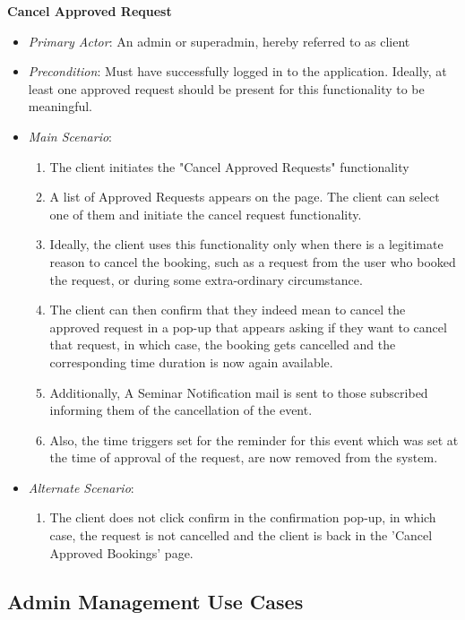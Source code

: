 \documentclass{article}
\begin{document}
\textbf{Cancel Approved Request}
\label{uccancelapprovedrequest}
\begin{itemize}
    \item \textit{Primary Actor}: An admin or superadmin, hereby referred to as client
    \item \textit{Precondition}: Must have successfully logged in to the application. Ideally, at least one approved request should be present for this functionality to be meaningful. 
   \item \textit{Main Scenario}:
   \begin{enumerate}
       \item The client initiates the "Cancel Approved Requests" functionality
       \item A list of Approved Requests appears on the page. The client can select one of them and initiate the cancel request functionality.
       \item Ideally, the client uses this functionality only when there is a legitimate reason to cancel the booking, such as a request from the user who booked the request, or during some extra-ordinary circumstance.
       \item The client can then confirm that they indeed mean to cancel the approved request in a pop-up that appears asking if they want to cancel that request, in which case, the booking gets cancelled and the corresponding time duration is now again available.
       \item Additionally, A Seminar Notification mail is sent to those subscribed informing them of the cancellation of the event.
       \item Also, the time triggers set for the reminder for this event which was set at the time of approval of the request, are now removed from the system.
    \end{enumerate}
   \item \textit{Alternate Scenario}:
   \begin{enumerate}
       \item The client does not click confirm in the confirmation pop-up, in which case, the request is not cancelled and the client is back in the 'Cancel Approved Bookings' page.
   \end{enumerate}
\end{itemize}


\subsection{Admin Management Use Cases}
\end{document}
